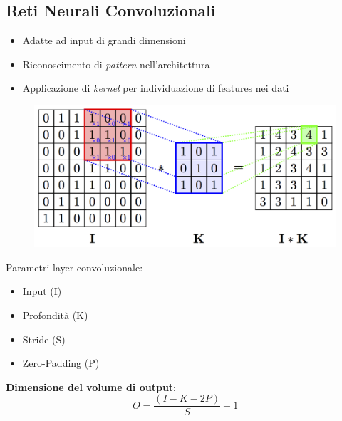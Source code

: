 \documentclass[xcolor=x11names,compress, 
					handout %
]{beamer}
\theoremstyle{definition} \newtheorem{esempio}{Esempio}
\theoremstyle{definition}
\begin{document}
	\subsection{Reti Neurali Convoluzionali}
		\begin{frame}{\subsecname}
			\begin{itemize}
				\item Adatte ad input di grandi dimensioni\pause
				\item Riconoscimento di \textit{pattern} nell'architettura\pause
				\item Applicazione di \textit{kernel} per individuazione di features nei dati
			\end{itemize}
			\begin{figure}
				\includegraphics[scale=0.9]{immagini/convolution}
			\end{figure}
		\end{frame}
		\begin{frame}{\subsecname}
			Parametri layer convoluzionale:
			\begin{itemize}
				\item Input (I)
				\item Profondità (K)
				\item Stride (S)
				\item Zero-Padding (P)
			\end{itemize}\pause
			\begin{center}
				\textbf{Dimensione del volume di output}:
				\begin{equation}
					O={\frac{(I - K - 2P)}{S} +1}
				\end{equation}
			\end{center}
		\end{frame}
\end{document}
